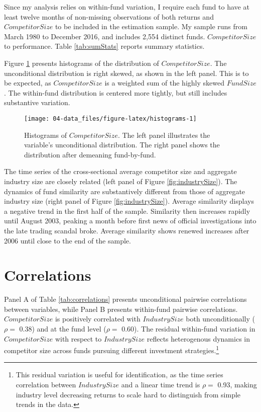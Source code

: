 \documentclass[openany]{book}
\let\rmarkdownfootnote\footnote%
\def\footnote{\protect\rmarkdownfootnote}
\theoremstyle{definition}
\theoremstyle{definition}
\theoremstyle{definition}
\theoremstyle{remark}
\begin{document}
Since my analysis relies on within-fund variation, I require each fund
to have at least twelve months of non-missing observations of both
returns and \(CompetitorSize\) to be included in the estimation sample.
My sample runs from March 1980 to December 2016, and includes 2,554
distinct funds. \(CompetitorSize\) to performance. Table
\ref{tab:sumStats} reports summary statistics.

Figure \ref{fig:histograms} presents histograms of the distribution of
\(CompetitorSize\). The unconditional distribution is right skewed, as
shown in the left panel. This is to be expected, as \(CompetitorSize\)
is a weighted sum of the highly skewed \(FundSize\). The within-fund
distribution is centered more tightly, but still includes substantive
variation.

\begin{figure}

{\centering \texttt{[image: 04-data\_files/figure-latex/histograms-1]} 

}

\caption{Histograms of $CompetitorSize$. The left panel illustrates the variable's unconditional distribution. The right panel shows the distribution after demeaning fund-by-fund.}\label{fig:histograms}
\end{figure}

The time series of the cross-sectional average competitor size and
aggregate industry size are closely related (left panel of Figure
\ref{fig:industrySize}). The dynamics of fund similarity are
substantively different from those of aggregate industry size (right
panel of Figure \ref{fig:industrySize}). Average similarity displays a
negative trend in the first half of the sample. Similarity then
increases rapidly until August 2003, peaking a month before first news
of official investigations into the late trading scandal broke. Average
similarity shows renewed increases after 2006 until close to the end of
the sample.

\hypertarget{correlations}{%
\section{Correlations}\label{correlations}}

Panel A of Table \ref{tab:correlations} presents unconditional pairwise
correlations between variables, while Panel B presents within-fund
pairwise correlations. \(CompetitorSize\) is positively correlated with
\(IndustrySize\) both unconditionally (\(\rho=\) 0.38) and at the fund
level (\(\rho=\) 0.60). The residual within-fund variation in
\(CompetitorSize\) with respect to \(IndustrySize\) reflects
heterogenous dynamics in competitor size across funds pursuing different
investment strategies.\footnote{This residual variation is useful for
  identification, as the time series correlation between
  \(IndustrySize\) and a linear time trend is \(\rho=\) 0.93, making
  industry level decreasing returns to scale hard to distinguish from
  simple trends in the data.}
\end{document}

